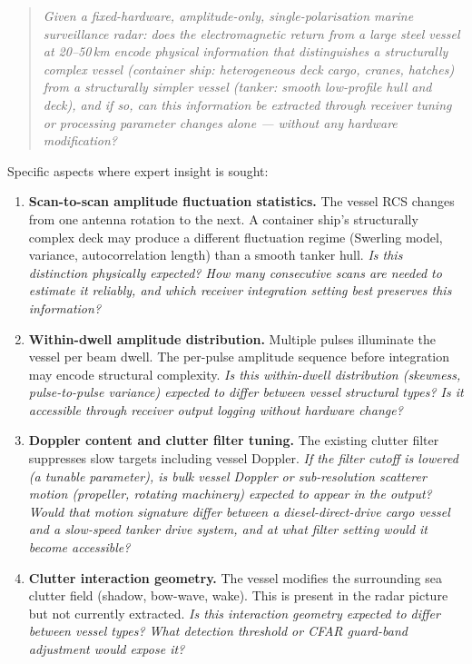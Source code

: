 \documentclass[10.5pt,a4paper]{article}
\begin{document}
\begin{quote}
\itshape
Given a fixed-hardware, amplitude-only, single-polarisation marine surveillance
radar: does the electromagnetic return from a large steel vessel at 20--50\,km
encode physical information that distinguishes a structurally complex vessel
(container ship: heterogeneous deck cargo, cranes, hatches) from a structurally
simpler vessel (tanker: smooth low-profile hull and deck), and if so, can this
information be extracted through receiver tuning or processing parameter changes
alone — without any hardware modification?
\end{quote}

Specific aspects where expert insight is sought:

\begin{enumerate}[noitemsep, leftmargin=*, label=\arabic*.]

  \item \textbf{Scan-to-scan amplitude fluctuation statistics.}
  The vessel RCS changes from one antenna rotation to the next. A container ship's
  structurally complex deck may produce a different fluctuation regime (Swerling
  model, variance, autocorrelation length) than a smooth tanker hull.
  \textit{Is this distinction physically expected? How many consecutive scans are
  needed to estimate it reliably, and which receiver integration setting best
  preserves this information?}

  \item \textbf{Within-dwell amplitude distribution.}
  Multiple pulses illuminate the vessel per beam dwell. The per-pulse amplitude
  sequence before integration may encode structural complexity.
  \textit{Is this within-dwell distribution (skewness, pulse-to-pulse variance)
  expected to differ between vessel structural types? Is it accessible through
  receiver output logging without hardware change?}

  \item \textbf{Doppler content and clutter filter tuning.}
  The existing clutter filter suppresses slow targets including vessel Doppler.
  \textit{If the filter cutoff is lowered (a tunable parameter), is bulk vessel
  Doppler or sub-resolution scatterer motion (propeller, rotating machinery)
  expected to appear in the output? Would that motion signature differ between
  a diesel-direct-drive cargo vessel and a slow-speed tanker drive system,
  and at what filter setting would it become accessible?}

  \item \textbf{Clutter interaction geometry.}
  The vessel modifies the surrounding sea clutter field (shadow, bow-wave, wake).
  This is present in the radar picture but not currently extracted.
  \textit{Is this interaction geometry expected to differ between vessel types?
  What detection threshold or CFAR guard-band adjustment would expose it?}


\end{enumerate}
\end{document}
